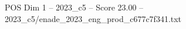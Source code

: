 \begin{textsample}{POS Dim 1 – 2023\_c5 – Score 23.00 – 2023\_c5/enade\_2023\_eng\_prod\_c677c7f341.txt}
\end{textsample}
